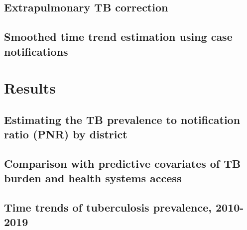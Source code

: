 \documentclass[
]{article}
\begin{document}
\lipsum[3-5]

\hypertarget{extrapulmonary-tb-correction}{%
\subsection{Extrapulmonary TB correction}\label{extrapulmonary-tb-correction}}

\lipsum[6]

\hypertarget{smoothed-time-trend-estimation-using-case-notifications}{%
\subsection{Smoothed time trend estimation using case notifications}\label{smoothed-time-trend-estimation-using-case-notifications}}

\lipsum[7-12]

\hypertarget{results}{%
\section{Results}\label{results}}

\lipsum[13]

\hypertarget{estimating-the-tb-prevalence-to-notification-ratio-pnr-by-district}{%
\subsection{Estimating the TB prevalence to notification ratio (PNR) by district}\label{estimating-the-tb-prevalence-to-notification-ratio-pnr-by-district}}

\lipsum[1-4]

\hypertarget{comparison-with-predictive-covariates-of-tb-burden-and-health-systems-access}{%
\subsection{Comparison with predictive covariates of TB burden and health systems access}\label{comparison-with-predictive-covariates-of-tb-burden-and-health-systems-access}}

\lipsum[5-10]

\hypertarget{time-trends-of-tuberculosis-prevalence-2010-2019}{%
\subsection{Time trends of tuberculosis prevalence, 2010-2019}\label{time-trends-of-tuberculosis-prevalence-2010-2019}}
\end{document}
